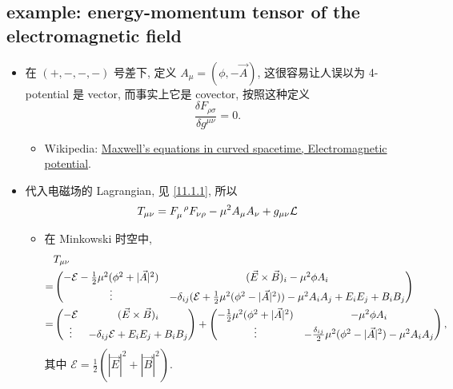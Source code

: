 \subsection{example: energy-momentum tensor of the electromagnetic field} \label{subsection D.4.1}
\begin{itemize}
	\item 在 $(+, -, -, -)$ 号差下, 定义 $A_\mu = (\phi, - \vec{A})$, 这很容易让人误以为 4-potential 是 vector, 而事实上它是 covector, 按照这种定义
	\begin{equation}
		\frac{\delta F_{\rho \sigma}}{\delta g^{\mu \nu}} = 0.
	\end{equation}
	\begin{itemize}
		\item Wikipedia: \href{https://en.wikipedia.org/wiki/Maxwell%27s_equations_in_curved_spacetime#Electromagnetic_potential}{Maxwell's equations in curved spacetime, Electromagnetic potential}.
	\end{itemize}
	
	\item 代入电磁场的 Lagrangian, 见 \eqref{11.1.1}, 所以
	\begin{equation}
		T_{\mu \nu} = \tensor{F}{_\mu^\rho} F_{\nu \rho} - \mu^2 A_\mu A_\nu + g_{\mu \nu} \mathcal{L}
	\end{equation}
	
	\begin{itemize}
		\item 在 Minkowski 时空中,
		\begin{align}
			& T_{\mu \nu} \notag \\
			=& \begin{pmatrix}
				- \mathcal{E} - \frac{1}{2} \mu^2 (\phi^2 + |\vec{A}|^2) & (\vec{E} \times \vec{B})_i - \mu^2 \phi A_i \\
				\vdots & - \delta_{i j} (\mathcal{E} + \frac{1}{2} \mu^2 (\phi^2 - |\vec{A}|^2)) - \mu^2 A_i A_j + E_i E_j + B_i B_j
			\end{pmatrix} \notag \\
			=& \begin{pmatrix}
				- \mathcal{E} & (\vec{E} \times \vec{B})_i \\
				\vdots & - \delta_{i j} \mathcal{E} + E_i E_j + B_i B_j
			\end{pmatrix} + \begin{pmatrix}
				- \frac{1}{2} \mu^2 (\phi^2 + |\vec{A}|^2) & - \mu^2 \phi A_i \\
				\vdots & - \frac{\delta_{i j}}{2} \mu^2 (\phi^2 - |\vec{A}|^2) - \mu^2 A_i A_j
			\end{pmatrix},
		\end{align}
		其中 $\mathcal{E} = \frac{1}{2} (|\vec{E}|^2 + |\vec{B}|^2)$.
		

\end{itemize}
\end{itemize}
